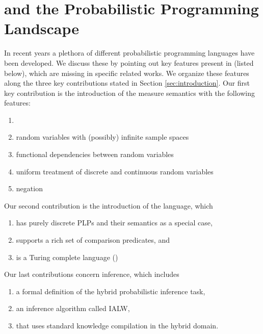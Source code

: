 \section{\dcproblogsty and the Probabilistic Programming Landscape}\label{sec:related}

In recent years a plethora of different probabilistic programming languages have been developed. 
We discuss these by pointing out key features present in \dcproblogsty (listed below), which are missing in specific related works.
We organize these features along the three key contributions stated in Section \ref{sec:introduction}. Our first key contribution is the introduction of the measure semantics with the following features:


\begin{enumerate}[label=C1.\arabic*, leftmargin=2\parindent]
    \item {} 
    \label{f:infinite_number_of rv}
    \item random variables with (possibly) infinite sample spaces
    \label{f:infinite_samplespaces}
    \item functional dependencies between random variables
    \label{f:rv_dependencies}
    \item uniform treatment of discrete and continuous random variables
    \label{f:dc_rv_uniform}
    \item negation
    \label{f:declarative_negation}
\end{enumerate}

\noindent Our second contribution is the  introduction of  the \dcproblogsty language, which  
\begin{enumerate}[label=C2.\arabic*, leftmargin=2\parindent]
    \item has purely discrete PLPs and their semantics as a special case,
    \label{f:discrete_special}
    \item supports a rich set of comparison predicates, and
    \label{f:comparison_predicates}
    \item is a Turing complete language (\dcplpsty)
    \label{f:turing_complete}
\end{enumerate}

\noindent Our last contributions concern inference, which includes 
\begin{enumerate}[label=C3.\arabic*, leftmargin=2\parindent]
    \item a formal definition of the hybrid probabilistic inference task,
    \label{f:definition_inference}
    \item an inference algorithm called IALW, 
    \label{f:inference_algorithm}
    \item that uses standard knowledge compilation in the hybrid domain.
    \label{f:inference_kc}
\end{enumerate}


